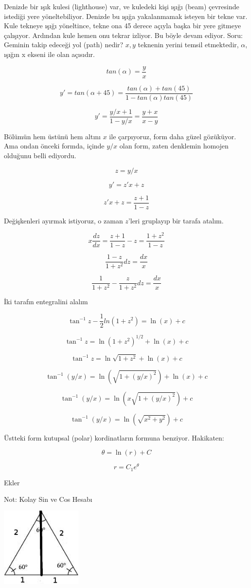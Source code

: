 \documentclass[12pt,fleqn]{article}\usepackage{../../common}
\begin{document}
Denizde bir ışık kulesi (lighthouse) var, ve kuledeki kişi ışığı (beam)
çevresinde istediği yere yöneltebiliyor. Denizde bu ışığa yakalanmamak
isteyen bir tekne var. Kule tekneye ışığı yöneltince, tekne ona 45 derece
açıyla başka bir yere gitmeye çalışıyor. Ardından kule hemen onu tekrar
izliyor. Bu böyle devam ediyor. Soru: Geminin takip edeceği yol (path)
nedir? $x,y$ teknenin yerini temsil etmektedir, $\alpha$, ışığın x ekseni
ile olan açısıdır.

$$ tan (\alpha) = \frac{y}{x} $$

$$ y' = tan(\alpha + 45) = \frac{tan(\alpha) + tan(45)}{1 - tan(\alpha)tan(45)} $$

$$ y' = \frac{y/x + 1}{1-y/x} =  \frac{y+x}{x-y} $$

Bölümün hem üstünü hem altını $x$ ile çarpıyoruz, form daha güzel
gözüküyor. Ama ondan önceki formda, içinde $y/x$ olan form, zaten denklemin
homojen olduğunu belli ediyordu.

$$ z = y/x $$

$$ y' = z'x + z $$

$$ z'x +z = \frac{z+1}{1-z} $$

Değişkenleri ayırmak istiyoruz, o zaman $z$'leri gruplayıp bir tarafa
atalım.

$$ x \frac{dz}{dx} = \frac{z+1}{1-z} - z = \frac{1+z^2}{1-z} $$

$$ \frac{1-z}{1+z^2}dz = \frac{dx}{x} $$

$$ \frac{1}{1+z^2} - \frac{z}{1+z^2} dz = \frac{dx}{x} $$

İki tarafın entegralini alalım

$$ \tan^{-1}z - \frac{1}{2} ln (1+z^2) = \ln(x) + c $$

$$ \tan^{-1}z = \ln (1+z^2)^{1/2} + \ln(x) + c $$

$$ \tan^{-1}z = \ln \sqrt{1+z^2} + \ln(x) + c $$

$$ \tan^{-1}(y/x) = \ln(\sqrt{1+(y/x)^2}) + \ln(x) + c $$

$$ \tan^{-1}(y/x) = \ln(x \sqrt{1+(y/x)^2}) + c $$

$$ \tan^{-1}(y/x) = \ln(\sqrt{x^2+y^2}) + c $$

Üstteki form kutupsal (polar) kordinatların formuna benziyor. Hakikaten:

$$ \theta = \ln(r) + C $$

$$ r = C_1e^{\theta} $$

Ekler

Not: Kolay Sin ve Cos Hesabı

\includegraphics[height=4cm]{4_3.png}
\end{document}
